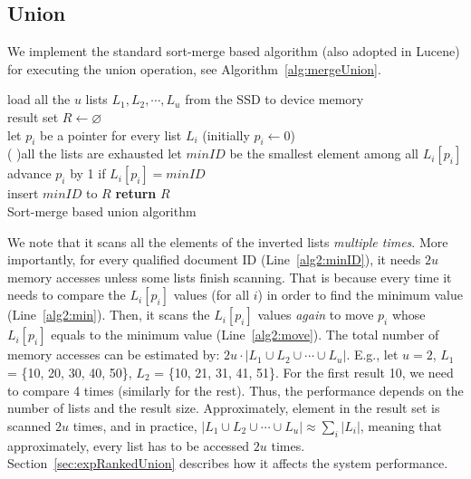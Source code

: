 \subsection{Union}\label{sec:union}
We implement the standard sort-merge based algorithm (also adopted in Lucene) for executing the union operation, see Algorithm~\ref{alg:mergeUnion}.
 \begin{algorithm}[htbp]\small

load all the $u$ lists $L_1, L_2, \cdots, L_u$ from the SSD to device memory\\
result set $R \leftarrow \varnothing$\\
let $p_i$ be a pointer for every list $L_i$ (initially $p_i \leftarrow 0$)\\
\Repeat( ){all the lists are exhausted}{
 let $minID$ be the smallest element among all $L_i[p_i]$\\
 advance $p_i$ by 1 if $L_i[p_i] = minID$\\
 insert $minID$ to $R$
 }
 \textbf{return} $R$\\
 \caption{Sort-merge based union algorithm}\label{alg:mergeUnion}
 \end{algorithm}
We note that it scans all the elements of the inverted lists \emph{multiple times}. More importantly, for every qualified document ID (Line~\ref{alg2:minID}), it needs $2u$ memory accesses unless some lists finish scanning. That is because every time it needs to compare the $L_i[p_i]$ values (for all $i$) in order to find the minimum value (Line~\ref{alg2:min}). Then, it scans the $L_i[p_i]$ values \emph{again} to move $p_i$ whose $L_i[p_i]$ equals to the minimum value (Line~\ref{alg2:move}). The total number of memory accesses can be estimated by: $2u\cdot |L_1 \cup L_2 \cup \cdots \cup L_u|$. E.g., let $u=2$, $L_1$ = \{10, 20, 30, 40, 50\}, $L_2$ = \{10, 21, 31, 41, 51\}. For the first result 10, we need to compare 4 times (similarly for the rest).
Thus, the performance depends on the number of lists and the result size. Approximately, element in the result set is scanned $2u$ times, and in practice, $|L_1 \cup L_2 \cup \cdots \cup L_u| \approx \sum_i|L_i|$, meaning that approximately, every list has to be accessed $2u$ times. Section~\ref{sec:expRankedUnion} describes how it affects the system performance.%


